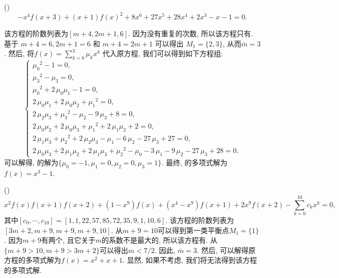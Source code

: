 \begin{example}
(\BPone{})
\begin{equation}
-x^4f(x+3)+(x+1)f(x)^2+8x^6+27x^5+28x^4+2x^3-x-1=0 \label{ep1} .
\end{equation}

该方程的阶数列表为$[m+4,2m+1,6]$. 因为没有重复的次数, 所以该方程只有\BPone{}. 基于 $m+4=6,2m+1=6$ 和 $m+4=2m+1$ 可以得出 $M_1=\{2,3\}$, 从而$\overline m = 3$. 然后, 将$f(x)=\sum\nolimits_{k=0}^3{\mu_k x^k}$ 代入原方程, 我们可以得到如下方程组:
\begin{equation}
\left\{
\begin{array}{l}
    {\mu_{{0}}}^{2}-1=0,                                                                                                  \\
    {\mu_{{3}}}^{2}-\mu_{{3}}=0,                                                                                            \\
    {\mu_{{0}}}^{2}+2\,\mu_{{0}}\mu_{{1}}-1=0,                                                                                \\
    2\,\mu_{{0}}\mu_{{1}}+2\,\mu_{{0}}\mu_{{2}}+{\mu_{{1}}}^{2}=0,                                                                \\
    2\,\mu_{{2}}\mu_{{3}}+{\mu_{{3}}}^{2}-\mu_{{2}}-9\,\mu_{{3}}+8=0,                                                             \\
    2\,\mu_{{0}}\mu_{{2}}+2\,\mu_{{0}}\mu_{{3}}+{\mu_{{1}}}^{2}+2\,\mu_{{1}}\mu_{{2}}+2=0,                                            \\
    2\,\mu_{{1}}\mu_{{3}}+{\mu_{{2}}}^{2}+2\,\mu_{{2}}\mu_{{3}}-\mu_{{1}}-6\,\mu_{{2}}-27\,\mu_{{3}}+27=0,                              \\
    2\,\mu_{{0}}\mu_{{3}}+2\,\mu_{{1}}\mu_{{2}}+2\,\mu_{{1}}\mu_{{3}}+{\mu_{{2}}}^{2}-\mu_{{0}}-3\,\mu_{{1}}-9\,\mu_{{2}}-27\,\mu_{{3}}+28=0.
\end{array}
\right.
\label{ceqs}
\end{equation}
可以解得, 的解为$\{\mu_0=-1,\mu_1=0,\mu_2=0,\mu_3=1\}$. 最终, 的多项式解为$f(x)=x^3-1$.
\end{example}

\begin{example}
(\BPtwo{})
\begin{equation}
x^2f(x)f(x+1)f(x+2)+(1-x^9)f(x)+(x^4-x^9)f(x+1)+2x^9f(x+2)-\sum_{k=0}^{10}{c_k x^k}=0, \label{ep2}
\end{equation}
其中$[c_0,\cdots,c_{10}]=[1,1,22,57,85,72,35,9,1,10,6]$. 该方程的阶数列表为$[3m+2,m+9,m+9,m+9,10]$. 从$m+9=10$可以得到第一类平衡点$M_1=\{1\}$. 因为$m+9$有两个, 且它关于$m$的系数不是最大的, 所以该方程有\BPtwo{}. 从$\{m+9> 10,m+9> 3m+2\}$可以得出$m< 7/2$. 因此, $\overline m=3$. 然后, 可以解得原方程的多项式解为$f(x)=x^2+x+1$. 显然, 如果不考虑\BPtwo{}, 我们将无法得到该方程的多项式解. 
\end{example}

